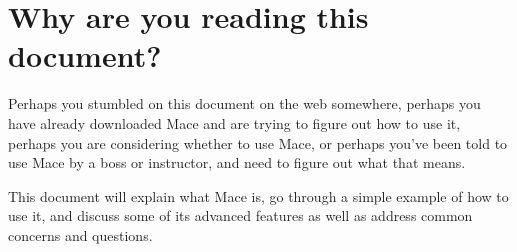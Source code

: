 % 
% 
% 
% 
% 
% 
\section{Why are you reading this document?}
\label{sec:intro}

Perhaps you stumbled on this document on the web somewhere, perhaps
you have already downloaded Mace and are trying to figure out how to
use it, perhaps you are considering whether to use Mace, or perhaps
you've been told to use Mace by a boss or instructor, and need to
figure out what that means.

This document will explain what Mace is, go through a simple example
of how to use it, and discuss some of its advanced features as well as
address common concerns and questions.

